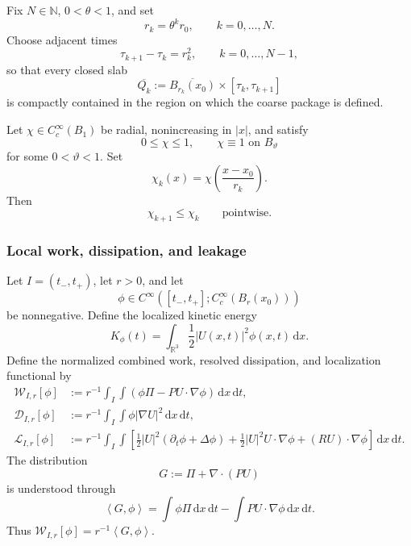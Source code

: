 \documentclass[10pt,a4paper]{amsart}
\numberwithin{equation}{section}
\newcommand{\R}{\mathbb R}
\newcommand{\dx}{\,\mathrm dx}
\newcommand{\dxdt}{\,\mathrm dx\,\mathrm dt}
\newcommand{\pair}[2]{\left\langle #1,#2\right\rangle}
\newcommand{\W}{\mathcal W}
\newcommand{\D}{\mathcal D}
\newcommand{\Lk}{\mathcal L}
\begin{document}
Fix \(N\in\mathbb N\), \(0<\theta<1\), and set
\begin{equation}\label{eq:radii}
r_k=\theta^k r_0,
\qquad
k=0,\ldots,N.
\end{equation}
Choose adjacent times
\begin{equation}\label{eq:times}
\tau_{k+1}-\tau_k=r_k^2,
\qquad
k=0,\ldots,N-1,
\end{equation}
so that every closed slab
\[
\overline{Q_k}
:=
\overline{B_{r_k}(x_0)}\times[\tau_k,\tau_{k+1}]
\]
is compactly contained in the region on which the coarse package is defined.

Let \(\chi\in C_c^\infty(B_1)\) be radial, nonincreasing in \(|x|\), and satisfy
\begin{equation}\label{eq:base-cutoff}
0\le \chi\le1,
\qquad
\chi\equiv1\text{ on }B_\vartheta
\end{equation}
for some \(0<\vartheta<1\). Set
\begin{equation}\label{eq:chi-k}
\chi_k(x)=\chi\left(\frac{x-x_0}{r_k}\right).
\end{equation}
Then
\begin{equation}\label{eq:nesting}
\chi_{k+1}\le\chi_k
\qquad\text{pointwise.}
\end{equation}

\subsubsection{Local work, dissipation, and leakage}

Let \(I=(t_-,t_+)\), let \(r>0\), and let
\[
\phi\in C^\infty([t_-,t_+];C_c^\infty(B_r(x_0)))
\]
be nonnegative. Define the localized kinetic energy
\begin{equation}\label{eq:Kphi}
K_\phi(t)=\int_{\R^3}\frac12|U(x,t)|^2\phi(x,t)\dx.
\end{equation}
Define the normalized combined work, resolved dissipation, and localization functional by
\begin{align}
\W_{I,r}[\phi]
&:=
r^{-1}\int_I\int
\left(
\phi\Pi-PU\cdot\nabla\phi
\right)\dxdt,
\label{eq:W-def}
\\
\D_{I,r}[\phi]
&:=
r^{-1}\int_I\int
\phi|\nabla U|^2\dxdt,
\label{eq:D-def}
\\
\Lk_{I,r}[\phi]
&:=
r^{-1}\int_I\int
\left[
\frac12|U|^2(\partial_t\phi+\Delta\phi)
+
\frac12|U|^2U\cdot\nabla\phi
+
(RU)\cdot\nabla\phi
\right]\dxdt.
\label{eq:L-def}
\end{align}
The distribution
\begin{equation}\label{eq:G-def}
G:=\Pi+\nabla\cdot(PU)
\end{equation}
is understood through
\begin{equation}\label{eq:G-pairing}
\pair{G}{\phi}
=
\int\phi\Pi\dxdt-
\int PU\cdot\nabla\phi\dxdt.
\end{equation}
Thus \(\W_{I,r}[\phi]=r^{-1}\pair{G}{\phi}\).
\end{document}
